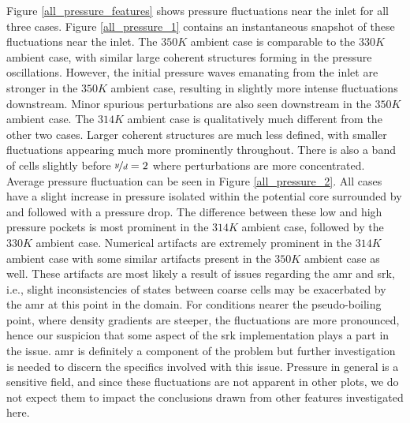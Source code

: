 Figure \ref{all_pressure_features} shows pressure fluctuations near the inlet for all three cases. Figure \ref{all_pressure_1} contains an instantaneous snapshot of these fluctuations near the inlet. The $350 K$ ambient case is comparable to the $330 K$ ambient case, with similar large coherent structures forming in the pressure oscillations. However, the initial pressure waves emanating from the inlet are stronger in the $350 K$ ambient case, resulting in slightly more intense fluctuations downstream. Minor spurious perturbations are also seen downstream in the $350 K$ ambient case. The $314 K$ ambient case is qualitatively much different from the other two cases. Larger coherent structures are much less defined, with smaller fluctuations appearing much more prominently throughout. There is also a band of cells slightly before $\nicefrac{y}{d}=2$ where perturbations are more concentrated. Average pressure fluctuation can be seen in Figure \ref{all_pressure_2}. All cases have a slight increase in pressure isolated within the potential core surrounded by and followed with a pressure drop. The difference between these low and high pressure pockets is most prominent in the $314 K$ ambient case, followed by the $330 K$ ambient case. Numerical artifacts are extremely prominent in the $314 K$ ambient case with some similar artifacts present in the $350 K$ ambient case as well. These artifacts are most likely a result of issues regarding the \gls{amr} and \gls{srk}, i.e., slight inconsistencies of states between coarse cells may be exacerbated by the \gls{amr} at this point in the domain. For conditions nearer the pseudo-boiling point, where density gradients are steeper, the fluctuations are more pronounced, hence our suspicion that some aspect of the \gls{srk} implementation plays a part in the issue. \gls{amr} is definitely a component of the problem but further investigation is needed to discern the specifics involved with this issue. Pressure in general is a sensitive field, and since these fluctuations are not apparent in other plots, we do not expect them to impact the conclusions drawn from other features investigated here.  

